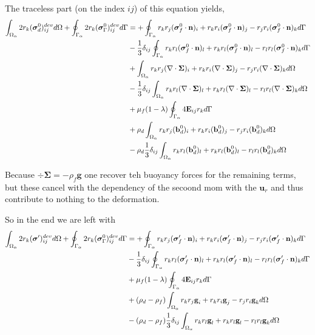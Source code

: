 The traceless part (on the index $ij$) of this equation yields, 
\begin{align}
    \int_{\Omega_{\alpha}} 2 r_{k}(\bm{\sigma}^0_d)_{ij}^{dev} d\Omega
    +\oint_{\Gamma_{\alpha}} 2r_{k}(\bm{\sigma}^0_\Gamma)_{ij}^{dev} d\Gamma
    &= 
    +\oint_{\Gamma_{\alpha}} 
        r_{k}r_{j} (\bm{\sigma}_f^0\cdot\textbf{n})_i 
        + r_{k}r_{i} (\bm{\sigma}_f^0\cdot\textbf{n})_j 
        - r_{j}r_{i} (\bm{\sigma}_f^0\cdot\textbf{n})_k 
     d\Gamma\\
    &-\frac{1}{3}\delta_{ij}\oint_{\Gamma_{\alpha}} 
        r_{k}r_{l} (\bm{\sigma}_f^0\cdot\textbf{n})_l
        + r_{k}r_{l} (\bm{\sigma}_f^0\cdot\textbf{n})_l 
        - r_{l}r_{l} (\bm{\sigma}_f^0\cdot\textbf{n})_k 
     d\Gamma\\
    &+\int_{\Omega_{\alpha}}   
        r_{k}r_{j} (\mathbf{\nabla}\cdot \bm{\Sigma})_i 
        +r_{k}r_{i} (\mathbf{\nabla}\cdot \bm{\Sigma})_j 
        -r_{j}r_{i} (\mathbf{\nabla}\cdot \bm{\Sigma})_k 
         d\Omega\\
    &-\frac{1}{3}\delta_{ij}\int_{\Omega_{\alpha}}   
        r_{k}r_{l} (\mathbf{\nabla}\cdot \bm{\Sigma})_l
        +r_{k}r_{l} (\mathbf{\nabla}\cdot \bm{\Sigma})_l 
        -r_{l}r_{l} (\mathbf{\nabla}\cdot \bm{\Sigma})_k 
         d\Omega\\
    &+\mu_f (1-\lambda)\oint_{\Gamma_{\alpha}}  4\textbf{E}_{ij} r_{k}   d\Gamma
    \\
    &
    + \rho_d \int_{\Omega_{\alpha}}  
        r_{k}r_{j} (\textbf{b}_d^0)_i 
        +r_{k}r_{i} (\textbf{b}_d^0)_j 
        -r_{j}r_{i} (\textbf{b}_d^0)_k 
         d\Omega\\
    &-\rho_d \frac{1}{3}\delta_{ij} \int_{\Omega_{\alpha}}  
        r_{k}r_{l} (\textbf{b}_d^0)_l 
        +r_{k}r_{l} (\textbf{b}_d^0)_l 
        -r_{l}r_{l} (\textbf{b}_d^0)_k 
         d\Omega
\end{align}


Because $\div\bm\Sigma = - \rho_f \textbf{g}$ one recover teh buoyancy forces for the remaining terms, but these cancel with the dependency of the secoond mom with the $\textbf{u}_r$ and thus contribute to nothing to the deformation. 

So in the end we are left with 
\begin{align}
    \int_{\Omega_{\alpha}} 2 r_{k}(\bm{\sigma}')_{ij}^{dev} d\Omega
    +\oint_{\Gamma_{\alpha}} 2r_{k}(\bm{\sigma}^0_\Gamma)_{ij}^{dev} d\Gamma
    &= 
    +\oint_{\Gamma_{\alpha}} 
        r_{k}r_{j} (\bm{\sigma}'_f\cdot\textbf{n})_i 
        + r_{k}r_{i} (\bm{\sigma}'_f\cdot\textbf{n})_j 
        - r_{j}r_{i} (\bm{\sigma}'_f\cdot\textbf{n})_k 
     d\Gamma\\
    &-\frac{1}{3}\delta_{ij}\oint_{\Gamma_{\alpha}} 
        r_{k}r_{l} (\bm{\sigma}'_f\cdot\textbf{n})_l
        + r_{k}r_{l} (\bm{\sigma}'_f\cdot\textbf{n})_l 
        - r_{l}r_{l} (\bm{\sigma}'_f\cdot\textbf{n})_k 
     d\Gamma\\
    &+\mu_f (1-\lambda)\oint_{\Gamma_{\alpha}}  4\textbf{E}_{ij} r_{k}   d\Gamma
    \\
    &
    + (\rho_d-\rho_f) \int_{\Omega_{\alpha}}  
        r_{k}r_{j} \textbf{g}_i 
        +r_{k}r_{i} \textbf{g}_j 
        -r_{j}r_{i} \textbf{g}_k 
         d\Omega\\
    &-(\rho_d-\rho_f) \frac{1}{3}\delta_{ij} \int_{\Omega_{\alpha}}  
        r_{k}r_{l} \textbf{g}_l 
        +r_{k}r_{l} \textbf{g}_l 
        -r_{l}r_{l} \textbf{g}_k 
         d\Omega
\end{align}
